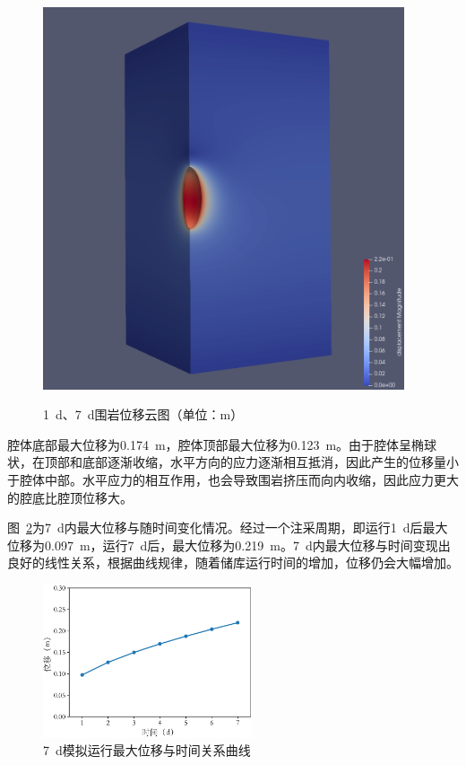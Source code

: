 \begin{figure}[ht!]
{\begin{minipage}{7cm}
            \includegraphics[width=0.95\textwidth]{img/chap5/7d位移云图.png}
        \end{minipage}
        \label{fig:dispalcement7d}
    }
    \caption{\SI{1}{d}、\SI{7}{d}围岩位移云图（单位：m）}
    \label{fig:dispalcement}
\end{figure}

腔体底部最大位移为\SI{0.174}{m}，腔体顶部最大位移为\SI{0.123}{m}。由于腔体呈椭球状，在顶部和底部逐渐收缩，水平方向的应力逐渐相互抵消，因此产生的位移量小于腔体中部。水平应力的相互作用，也会导致围岩挤压而向内收缩，因此应力更大的腔底比腔顶位移大。

图~\ref{fig:7d_displacement_max}为\SI{7}{d}内最大位移与随时间变化情况。经过一个注采周期，即运行\SI{1}{d}后最大位移为\SI{0.097}{m}，运行\SI{7}{d}后，最大位移为\SI{0.219}{m}。\SI{7}{d}内最大位移与时间变现出良好的线性关系，根据曲线规律，随着储库运行时间的增加，位移仍会大幅增加。


\begin{figure}[ht!]
    \centering
    \includegraphics[width=0.55\textwidth]{img/chap5/7d最大位移.pdf}
    \caption{\SI{7}{d}模拟运行最大位移与时间关系曲线}
    \label{fig:7d_displacement_max}
\end{figure}


